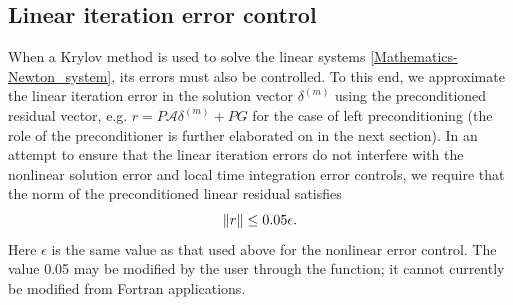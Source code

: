 \documentclass[letterpaper,10pt,english]{sphinxmanual}
\begin{document}
\subsection{Linear iteration error control}
\label{Mathematics:linear-iteration-error-control}\label{Mathematics:mathematics-error-linear}
When a Krylov method is used to solve the linear systems
\eqref{Mathematics-Newton_system}, its errors must also be controlled.  To this end,
we approximate the linear iteration error in the solution vector
$\delta^{(m)}$ using the preconditioned residual vector,
e.g. $r = P{\mathcal A}\delta^{(m)} + PG$ for the case of left
preconditioning (the role of the preconditioner is further elaborated
on in the next section).  In an attempt to ensure that the linear
iteration errors do not interfere with the nonlinear solution error
and local time integration error controls, we require that the norm of
the preconditioned linear residual satisfies
\begin{gather}
\begin{split}\|r\| \le 0.05\epsilon.\end{split}\notag
\end{gather}
Here $\epsilon$ is the same value as that used above for the
nonlinear error control.  The value 0.05 may be modified by the user
through the {\hyperref[c_interface/User_callable:ARKSpilsSetEpsLin]{}} function; it cannot
currently be modified from Fortran applications.
\end{document}
